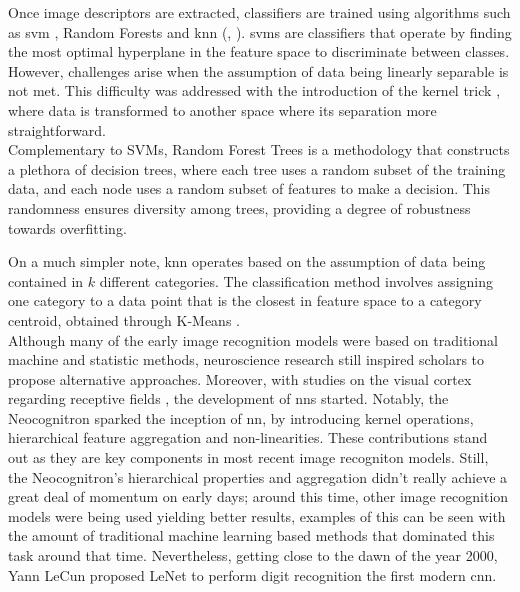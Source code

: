 \noindent Once image descriptors are extracted, classifiers are trained using algorithms such as 
\gls{svm} \autocite{cortes1995support}, Random Forests \autocite{ho1995random} and \gls{knn}
(\cite{cover1967nearest}, \cite{fix1989discriminatory}). \glspl{svm} are classifiers that operate 
by finding the most optimal hyperplane in the feature space to discriminate between classes. 
However, challenges arise when the assumption of data being linearly separable is not met. This 
difficulty was addressed with the introduction of the kernel trick \autocite{hofmann2008kernel}, 
where data is transformed to another space where its separation more straightforward.\\
Complementary to SVMs, Random Forest Trees is a methodology that constructs a plethora of decision 
trees, where each tree uses a random subset of the training data, and each node uses a random 
subset of features to make a decision. This randomness ensures diversity among trees, providing a 
degree of robustness towards overfitting.

On a much simpler note, \gls{knn} operates based on the assumption of data being contained in 
$k$ different categories. The classification method involves assigning one category to a data 
point that is the closest in feature space to a category centroid, obtained through K-Means 
\autocite{macqueen1967some}.\\

\noindent Although many of the early image recognition models were based on traditional machine 
and statistic methods, neuroscience research still inspired scholars to propose alternative 
approaches. Moreover, with studies on the visual cortex regarding receptive fields 
\autocite{hubel1959receptive}, the development of \glspl{nn} started. Notably, the 
Neocognitron \autocite{fukushima1975cognitron} sparked the inception of  \gls{nn}, by introducing 
kernel operations, hierarchical feature aggregation and non-linearities. These contributions stand 
out as they are key components in most recent image recogniton models.
Still, the Neocognitron's hierarchical properties and aggregation didn't really achieve 
a great deal of momentum on early days; around this time, other image recognition models were being 
used yielding better results, examples of this can be seen with the amount of traditional machine 
learning based methods that dominated this task around that time. Nevertheless, getting close to the 
dawn of the year 2000, Yann LeCun proposed LeNet to perform digit recognition 
\autocite{lecun1998gradient} the first modern \gls{cnn}.\\

